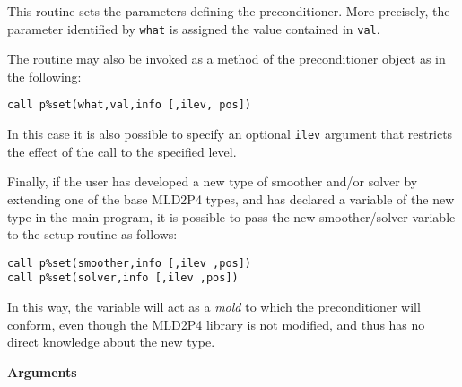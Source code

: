 \noindent
This routine sets the parameters defining the preconditioner. More
precisely, the parameter identified by \verb|what| is assigned the value
contained in \verb|val|. 

The routine may also be invoked as a method
of the preconditioner object as in the following:
\begin{center}
\verb|call p%set(what,val,info [,ilev, pos])|\\
\end{center}
In this case it is also possible to specify an optional \verb|ilev|
argument that restricts the effect of 
the call to the specified level.

Finally, if the user has developed  a new type of smoother and/or
solver by extending one of the base MLD2P4 types, and has declared a
variable of the new  type in the main program, it is possible to pass
the new smoother/solver variable  to the setup routine as follows:
\begin{center}
\verb|call p%set(smoother,info [,ilev ,pos])|\\
\verb|call p%set(solver,info [,ilev ,pos])|
\end{center}
In this way, the variable will act as a \emph{mold} to which the
preconditioner will conform, even though the MLD2P4 library is not
modified, and thus has no direct knowledge about the new type. 

{\baselineskip\noindent\large\bfseries Arguments}

